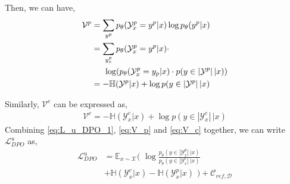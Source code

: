 \noindent Then, we can have,
%
\begin{align}
    \mathcal V^p &= \sum_{y^p} p_{\theta}(\mathcal Y^p_x=y^p|x) \log p_{\theta}(y^p|x) \\
    &= \sum_{y^p_x} p_{\theta}(\mathcal Y^p_x=y^p|x)\cdot\notag \\ &\!\,\,\,\,\,\,\,\,\,\,\log (p_{\theta}(\mathcal Y^p_x=y_p|x)\cdot p(y\in|\mathcal Y^p|\,|x)) \\
    &= -\mathbb H(\mathcal Y^p|x) + \log p(y\in|\mathcal Y^p|\,|x) \label{eq:V_p}
\end{align}
%

    
\noindent Similarly,  $\mathcal V^c$ can be expressed as,
%
\begin{align}
    \mathcal V^c = -\mathbb H(\mathcal Y^c_x|x) + \log p(y\in|\mathcal Y^c_x|\,|x) \label{eq:V_c}
\end{align}
%
Combining \eqref{eq:L_u_DPO_1}, \eqref{eq:V_p} and \eqref{eq:V_c} together, we can write $\mathcal L_{DPO}^u$ as,
%
\begin{equation}
  \begin{split}
    \mathcal L^u_{DPO} &= \mathbb E_{x\sim \mathcal X } ( \,\,\log \frac{p_\theta(y\in |\mathcal Y^p_x|\,|x)}{p_\theta(y\in |\mathcal Y^c_x|\,|x)} \\
    &+ \mathbb H(\mathcal Y^c_x|x) - \mathbb H(\mathcal Y^p_x|x) \,\,) + \mathcal C_{ref, \mathcal D}
  \end{split}
\end{equation}
%

